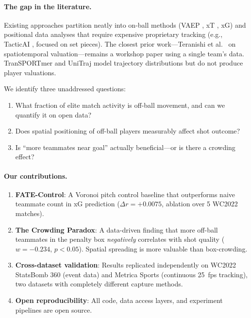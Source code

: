 \documentclass[10pt,twocolumn]{article}
\begin{document}
\paragraph{The gap in the literature.} Existing approaches partition neatly into on-ball methods (VAEP \citep{decroos2019vaep}, xT \citep{fernandez2019decomposing}, xG) and positional data analyses that require expensive proprietary tracking (e.g., TacticAI \citep{wang2023tacticai}, focused on set pieces). The closest prior work—Teranishi et al.~\citep{teranishi2022} on spatiotemporal valuation—remains a workshop paper using a single team's data. TranSPORTmer \citep{salzmann2024transporter} and UniTraj \citep{ye2024unitraj} model trajectory distributions but do not produce player valuations.

We identify three unaddressed questions:
\begin{enumerate}
  \item What fraction of elite match activity is off-ball movement, and can we quantify it on open data?
  \item Does spatial positioning of off-ball players measurably affect shot outcome?
  \item Is ``more teammates near goal'' actually beneficial—or is there a crowding effect?
\end{enumerate}

\paragraph{Our contributions.}
\begin{enumerate}
  \item \textbf{FATE-Control}: A Voronoi pitch control baseline that outperforms naive teammate count in xG prediction ($\Delta r = +0.0075$, ablation over 5 WC2022 matches).
  \item \textbf{The Crowding Paradox}: A data-driven finding that more off-ball teammates in the penalty box \emph{negatively} correlates with shot quality ($w = -0.234$, $p < 0.05$). Spatial spreading is more valuable than box-crowding.
  \item \textbf{Cross-dataset validation}: Results replicated independently on WC2022 StatsBomb 360 (event data) and Metrica Sports (continuous 25~fps tracking), two datasets with completely different capture methods.
  \item \textbf{Open reproducibility}: All code, data access layers, and experiment pipelines are open source.
\end{enumerate}
\end{document}
